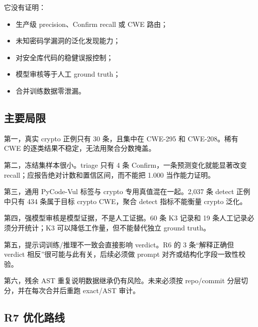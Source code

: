 \documentclass[UTF8,11pt,fontset=none]{ctexart}
\begin{document}
它没有证明：

\begin{itemize}
  \item 生产级 precision、Confirm recall 或 CWE 路由；
  \item 未知密码学漏洞的泛化发现能力；
  \item 对安全库代码的稳健误报控制；
  \item 模型审核等于人工 ground truth；
  \item 合并训练数据零泄漏。
\end{itemize}

\subsection{主要局限}

第一，真实 crypto 正例只有 30 条，且集中在 CWE-295 和 CWE-208。稀有 CWE 的逐类结果不稳定，无法用聚合分数掩盖。

第二，冻结集样本很小。triage 只有 4 条 Confirm，一条预测变化就能显著改变 recall；应报告绝对计数和置信区间，而不能把 1.000 当作能力证明。

第三，通用 PyCode-Vul 标签与 crypto 专用真值混在一起。2,037 条 detect 正例中只有 434 条属于目标 crypto CWE，聚合 detect 指标不能衡量 crypto 泛化。

第四，强模型审核是模型证据，不是人工证据。60 条 K3 记录和 19 条人工记录必须分开统计；K3 可以降低工作量，但不能替代独立 ground truth。

第五，提示词训练/推理不一致会直接影响 verdict。R6 的 3 条“解释正确但 verdict 相反”很可能与此有关，后续必须做 prompt 对齐或结构化字段一致性校验。

第六，残余 AST 重复说明数据继承仍有风险。未来必须按 repo/commit 分层切分，并在每次合并后重跑 exact/AST 审计。

\subsection{R7 优化路线}
\end{document}
